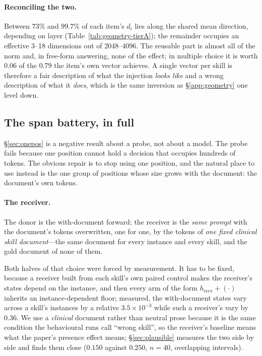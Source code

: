 \documentclass{article}
\newcommand{\dvec}{\ensuremath{d}}
\begin{document}
\paragraph{Reconciling the two.} Between $73\%$ and $99.7\%$ of each item's
$\dvec_i$ lies along the shared mean direction, depending on layer
(Table~\ref{tab:geometry-tierA}); the remainder occupies an effective 3--18 dimensions
out of 2048--4096. The reusable part is almost all of the norm and, in free-form
answering, none of the effect; in multiple choice it is worth $0.06$ of the
$0.79$ the item's own vector achieves. A single vector per skill is therefore a
fair description of
what the injection \emph{looks like} and a wrong description of what it
\emph{does}, which is the same inversion as \S\ref{app:geometry} one level
down.




\subsection{The span battery, in full}
\label{app:battery}

\S\ref{sec:onepos} is a negative result about a probe, not about a model. The
probe fails because one position cannot hold a decision that occupies hundreds
of tokens. The obvious repair is to stop using one position, and the natural
place to use instead is the one group of positions whose size grows with the
document: the document's own tokens.

\paragraph{The receiver.} The donor is the with-document forward; the receiver
is the \emph{same prompt} with the document's tokens overwritten, one for one,
by the tokens of \emph{one fixed clinical skill document}---the same document
for every instance and every skill, and the gold document of none of them.

Both halves of that choice were forced by measurement. It has to be fixed,
because a receiver built from each skill's own paired control makes the
receiver's states depend on the instance, and then every arm of the form
$h_{\text{recv}} + (\cdot)$ inherits an instance-dependent floor; measured, the
with-document states vary across a skill's instances by a relative
$3.5\times10^{-3}$ while such a receiver's vary by $0.36$. We use a
\emph{clinical} document rather than neutral prose because it is the same
condition the behavioural runs call
``wrong skill'', so the receiver's baseline means what the paper's presence
effect means; \S\ref{sec:plausible} measures the two side by side and finds them
close ($0.150$ against $0.250$, $n=40$, overlapping intervals).
\end{document}

